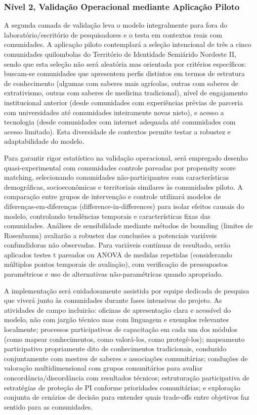 \subsubsection{Nível 2, Validação Operacional mediante Aplicação Piloto}

A segunda camada de validação leva o modelo integralmente para fora do laboratório/escritório de pesquisadores e o testa em contextos reais com comunidades. A aplicação piloto contemplará a seleção intencional de três a cinco comunidades quilombolas do Território de Identidade Semiárido Nordeste II, sendo que esta seleção não será aleatória mas orientada por critérios específicos: buscam-se comunidades que apresentem perfis distintos em termos de estrutura de conhecimento (algumas com saberes mais agrícolas, outras com saberes de extrativismo, outras com saberes de medicina tradicional), nível de engajamento institucional anterior (desde comunidades com experiências prévias de parceria com universidades até comunidades inteiramente novas nisto), e acesso a tecnologia (desde comunidades com internet adequada até comunidades com acesso limitado). Esta diversidade de contextos permite testar a robustez e adaptabilidade do modelo.

Para garantir rigor estatístico na validação operacional, será empregado desenho quasi-experimental com comunidades controle pareadas por propensity score matching, selecionando comunidades não-participantes com características demográficas, socioeconômicas e territoriais similares às comunidades piloto. A comparação entre grupos de intervenção e controle utilizará modelos de diferenças-em-diferenças (difference-in-differences) para isolar efeitos causais do modelo, controlando tendências temporais e características fixas das comunidades. Análises de sensibilidade mediante métodos de bounding (limites de Rosenbaum) avaliarão a robustez das conclusões a potenciais variáveis confundidoras não observadas. Para variáveis contínuas de resultado, serão aplicados testes t pareados ou ANOVA de medidas repetidas (considerando múltiplos pontos temporais de avaliação), com verificação de pressupostos paramétricos e uso de alternativas não-paramétricas quando apropriado.

A implementação será cuidadosamente assistida por equipe dedicada de pesquisa que viverá junto às comunidades durante fases intensivas do projeto. As atividades de campo incluirão: oficinas de apresentação clara e acessível do modelo, não com jargão técnico mas com linguagem e exemplos relevantes localmente; processos participativos de capacitação em cada um dos módulos (como mapear conhecimentos, como valorá-los, como protegê-los); mapeamento participativo propriamente dito de conhecimentos tradicionais, conduzido conjuntamente com mestres de saberes e associações comunitárias; conduções de valoração multidimensional com grupos comunitários para avaliar concordância/discordância com resultados técnicos; estruturação participativa de estratégias de proteção de PI conforme prioridades comunitárias; e exploração conjunta de cenários de decisão para entender quais trade-offs entre objetivos faz sentido para as comunidades.

